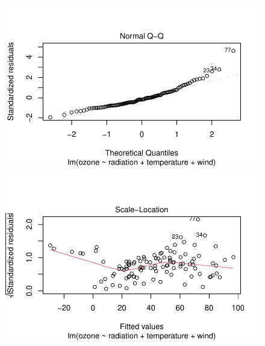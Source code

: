 \documentclass[
  a4paper,
  DIV=11,
  numbers=noendperiod]{scrartcl}
\begin{document}
\begin{figure}[H]

{\centering \includegraphics{StatsAssignment_files/figure-pdf/unnamed-chunk-8-2.pdf}

}

\end{figure}

\begin{figure}[H]

{\centering \includegraphics{StatsAssignment_files/figure-pdf/unnamed-chunk-8-3.pdf}

}

\end{figure}
\end{document}
